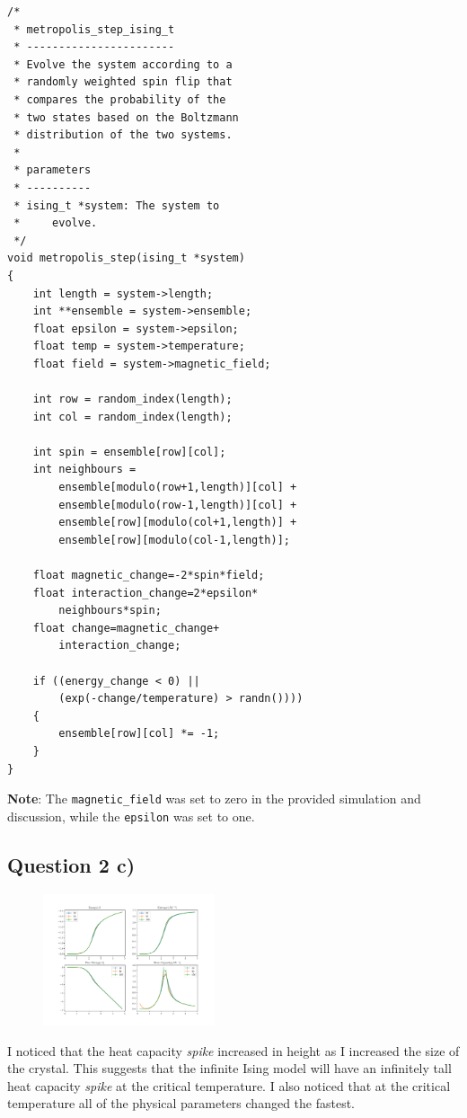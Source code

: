 \documentclass[a4paper, twocolumn]{article}
\begin{document}
\begin{lstlisting}
/*
 * metropolis_step_ising_t
 * -----------------------
 * Evolve the system according to a 
 * randomly weighted spin flip that 
 * compares the probability of the 
 * two states based on the Boltzmann 
 * distribution of the two systems. 
 *
 * parameters
 * ----------
 * ising_t *system: The system to 
 *     evolve. 
 */
void metropolis_step(ising_t *system)
{
    int length = system->length;
    int **ensemble = system->ensemble;
    float epsilon = system->epsilon;
    float temp = system->temperature;
    float field = system->magnetic_field;

    int row = random_index(length);
    int col = random_index(length);

    int spin = ensemble[row][col];
    int neighbours = 
        ensemble[modulo(row+1,length)][col] + 
        ensemble[modulo(row-1,length)][col] + 
        ensemble[row][modulo(col+1,length)] + 
        ensemble[row][modulo(col-1,length)];

    float magnetic_change=-2*spin*field;
    float interaction_change=2*epsilon*
        neighbours*spin;
    float change=magnetic_change+
        interaction_change;

    if ((energy_change < 0) || 
        (exp(-change/temperature) > randn())))
    {
        ensemble[row][col] *= -1;
    }
}
\end{lstlisting}


\textbf{Note}: The \verb!magnetic_field! was set to zero in the %
provided simulation and discussion, while the \verb!epsilon! %
was set to one. 


\subsection*{Question 2 c)}
\begin{figure}
    \centering
    \includegraphics[width=0.45\textwidth]{pub/figures/physical_parameters_ising_2d.pdf}
    \caption{}
    \label{fig:7}
\end{figure}
I noticed that the heat capacity \emph{spike} increased in %
height as I increased the size of the crystal. This suggests %
that the infinite Ising model will have an infinitely tall %
heat capacity \emph{spike} at the critical temperature. I also %
noticed that at the critical temperature all of the physical %
parameters changed the fastest. 
\end{document}
